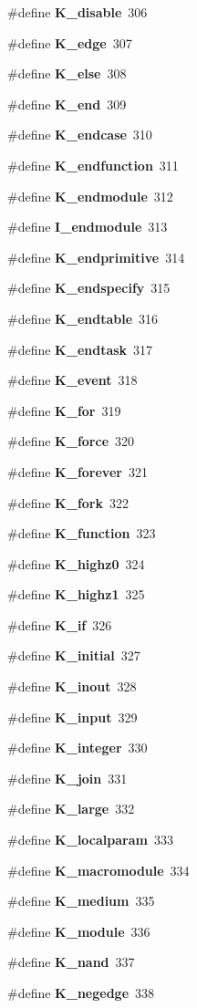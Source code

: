 \begin{CompactItemize}
\#define {\bf K\_\-disable}\ 306
\item 
\#define {\bf K\_\-edge}\ 307
\item 
\#define {\bf K\_\-else}\ 308
\item 
\#define {\bf K\_\-end}\ 309
\item 
\#define {\bf K\_\-endcase}\ 310
\item 
\#define {\bf K\_\-endfunction}\ 311
\item 
\#define {\bf K\_\-endmodule}\ 312
\item 
\#define {\bf I\_\-endmodule}\ 313
\item 
\#define {\bf K\_\-endprimitive}\ 314
\item 
\#define {\bf K\_\-endspecify}\ 315
\item 
\#define {\bf K\_\-endtable}\ 316
\item 
\#define {\bf K\_\-endtask}\ 317
\item 
\#define {\bf K\_\-event}\ 318
\item 
\#define {\bf K\_\-for}\ 319
\item 
\#define {\bf K\_\-force}\ 320
\item 
\#define {\bf K\_\-forever}\ 321
\item 
\#define {\bf K\_\-fork}\ 322
\item 
\#define {\bf K\_\-function}\ 323
\item 
\#define {\bf K\_\-highz0}\ 324
\item 
\#define {\bf K\_\-highz1}\ 325
\item 
\#define {\bf K\_\-if}\ 326
\item 
\#define {\bf K\_\-initial}\ 327
\item 
\#define {\bf K\_\-inout}\ 328
\item 
\#define {\bf K\_\-input}\ 329
\item 
\#define {\bf K\_\-integer}\ 330
\item 
\#define {\bf K\_\-join}\ 331
\item 
\#define {\bf K\_\-large}\ 332
\item 
\#define {\bf K\_\-localparam}\ 333
\item 
\#define {\bf K\_\-macromodule}\ 334
\item 
\#define {\bf K\_\-medium}\ 335
\item 
\#define {\bf K\_\-module}\ 336
\item 
\#define {\bf K\_\-nand}\ 337
\item 
\#define {\bf K\_\-negedge}\ 338
\item 

\end{CompactItemize}
